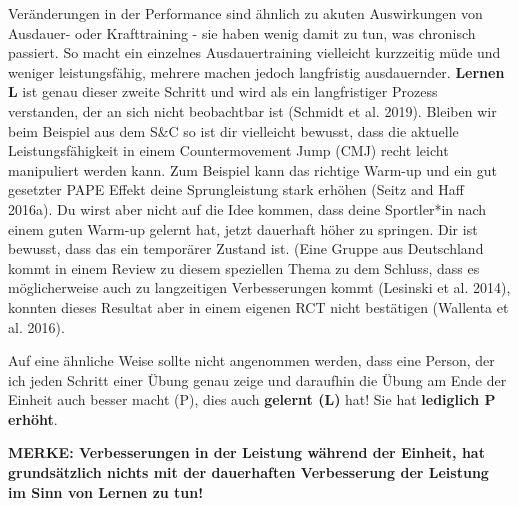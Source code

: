 \documentclass[
  letterpaper,
  DIV=11,
  numbers=noendperiod]{scrreprt}
\begin{document}
Veränderungen in der Performance sind ähnlich zu akuten Auswirkungen von
Ausdauer- oder Krafttraining - sie haben wenig damit zu tun, was
chronisch passiert. So macht ein einzelnes Ausdauertraining vielleicht
kurzzeitig müde und weniger leistungsfähig, mehrere machen jedoch
langfristig ausdauernder. \textbf{Lernen} \textbf{L} ist genau dieser
zweite Schritt und wird als ein langfristiger Prozess verstanden, der an
sich nicht beobachtbar ist (Schmidt et al. 2019). Bleiben wir beim
Beispiel aus dem S\&C so ist dir vielleicht bewusst, dass die aktuelle
Leistungsfähigkeit in einem Countermovement Jump (CMJ) recht leicht
manipuliert werden kann. Zum Beispiel kann das richtige Warm-up und ein
gut gesetzter PAPE Effekt deine Sprungleistung stark erhöhen (Seitz and
Haff 2016a). Du wirst aber nicht auf die Idee kommen, dass deine
Sportler*in nach einem guten Warm-up gelernt hat, jetzt dauerhaft höher
zu springen. Dir ist bewusst, dass das ein temporärer Zustand ist. (Eine
Gruppe aus Deutschland kommt in einem Review zu diesem speziellen Thema
zu dem Schluss, dass es möglicherweise auch zu langzeitigen
Verbesserungen kommt (Lesinski et al. 2014), konnten dieses Resultat
aber in einem eigenen RCT nicht bestätigen (Wallenta et al. 2016).

Auf eine ähnliche Weise sollte nicht angenommen werden, dass eine
Person, der ich jeden Schritt einer Übung genau zeige und daraufhin die
Übung am Ende der Einheit auch besser macht (P), dies auch
\textbf{gelernt (L)} hat! Sie hat \textbf{lediglich P erhöht}.

\begin{tcolorbox}[enhanced jigsaw, colback=white, toptitle=1mm, opacitybacktitle=0.6, title=\textcolor{quarto-callout-tip-color}{\faLightbulb}\hspace{0.5em}{Tip}, colframe=quarto-callout-tip-color-frame, colbacktitle=quarto-callout-tip-color!10!white, toprule=.15mm, rightrule=.15mm, bottomtitle=1mm, left=2mm, arc=.35mm, opacityback=0, titlerule=0mm, coltitle=black, breakable, leftrule=.75mm, bottomrule=.15mm]

\textbf{MERKE: Verbesserungen in der Leistung während der Einheit, hat
grundsätzlich nichts mit der dauerhaften Verbesserung der Leistung im
Sinn von Lernen zu tun!}

\end{tcolorbox}
\end{document}
